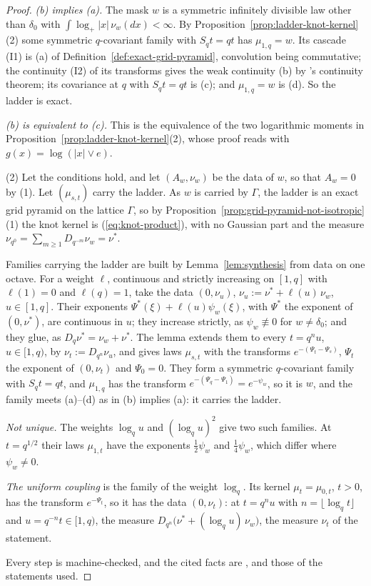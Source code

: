 \begin{proof}
\emph{(b) implies (a).} The mask $w$ is a symmetric infinitely divisible law other than $\delta_0$
with $\int\log_+|x|\,\nu_w(dx) < \infty$. By Proposition~\ref{prop:ladder-knot-kernel}(2) some
symmetric $q$-covariant family with $S_qt = qt$ has $\mu_{1,q} = w$. Its cascade (I1) is (a) of
Definition~\ref{def:exact-grid-pyramid}, convolution being commutative; the continuity (I2) of its
transforms gives the weak continuity (b) by \Levy's continuity theorem; its covariance at $q$ with
$S_qt = qt$ is (c); and $\mu_{1,q} = w$ is (d). So the ladder is exact.

\emph{(b) is equivalent to (c).} This is the equivalence of the two logarithmic moments in
Proposition~\ref{prop:ladder-knot-kernel}(2), whose proof reads  with
$g(x) = \log(|x| \vee e)$.

(2) Let the conditions hold, and let $(A_w, \nu_w)$ be the data of $w$, so that $A_w = 0$ by (1).
Let $(\mu_{s,t})$ carry the ladder. As $w$ is carried by $\Gamma$, the ladder is an exact grid
pyramid on the lattice $\Gamma$, so
by Proposition~\ref{prop:grid-pyramid-not-isotropic}(1) the knot kernel is (\ref{eq:knot-product}),
with no Gaussian part and the \Levy{} measure $\nu_{q^0} = \sum_{m \ge 1}D_{q^{-m}}\nu_w = \nu^*$.

Families carrying the ladder are built by Lemma~\ref{lem:synthesis} from data on one octave. For a
weight $\ell$, continuous and strictly increasing on $[1, q]$ with $\ell(1) = 0$ and $\ell(q) = 1$,
take the data $(0, \nu_u)$, $\nu_u := \nu^* + \ell(u)\,\nu_w$, $u \in [1, q]$. Their exponents
$\Psi^*(\xi) + \ell(u)\psi_w(\xi)$, with $\Psi^*$ the exponent of $(0, \nu^*)$, are continuous in $u$;
they increase strictly, as $\psi_w \not\equiv 0$ for $w \ne \delta_0$; and they glue, as
$D_q\nu^* = \nu_w + \nu^*$. The lemma extends them to every $t = q^nu$, $u \in [1, q)$, by
$\nu_t := D_{q^n}\nu_u$, and gives laws $\mu_{s,t}$ with the transforms $e^{-(\Psi_t - \Psi_s)}$,
$\Psi_t$ the exponent of $(0, \nu_t)$ and $\Psi_0 = 0$. They form a symmetric $q$-covariant family
with $S_qt = qt$, and $\mu_{1,q}$ has the transform $e^{-(\Psi_q - \Psi_1)} = e^{-\psi_w}$, so it is
$w$, and the family meets (a)--(d) as in (b) implies (a): it carries the ladder.

\emph{Not unique.} The weights $\log_qu$ and $(\log_qu)^2$ give two such families. At
$t = q^{1/2}$ their laws $\mu_{1,t}$ have the exponents $\tfrac12\psi_w$ and $\tfrac14\psi_w$, which
differ where $\psi_w \ne 0$.

\emph{The uniform coupling} is the family of the weight $\log_q$. Its kernel $\mu_t = \mu_{0,t}$,
$t > 0$, has the transform $e^{-\Psi_t}$, so it has the data $(0, \nu_t)$: at $t = q^nu$ with
$n = \lfloor\log_qt\rfloor$ and $u = q^{-n}t \in [1, q)$, the \Levy{} measure
$D_{q^n}\bigl(\nu^* + (\log_qu)\,\nu_w\bigr)$, the measure $\nu_t$ of the statement.

Every step is machine-checked, and the cited facts are ,  and those of the
statements used.
\end{proof}

